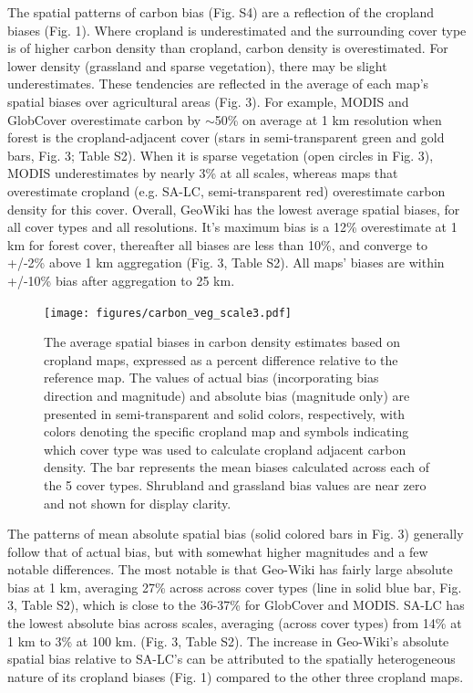 \documentclass{pnastwo}
\begin{document}
\begin{article}
The spatial patterns of carbon bias (Fig. S4) are a reflection of the cropland biases (Fig. 1). Where cropland is underestimated and the surrounding cover type is of higher carbon density than cropland, carbon density is overestimated. For lower density (grassland and sparse vegetation), there may be slight underestimates.  These tendencies are reflected in the average of each map's spatial biases over agricultural areas (Fig. 3).  For example, MODIS and GlobCover overestimate carbon by $\sim$50\% on average at 1 km resolution when forest is the cropland-adjacent cover (stars in semi-transparent green and gold bars, Fig. 3; Table S2). When it is sparse vegetation (open circles in Fig. 3), MODIS underestimates by nearly 3\% at all scales, whereas maps that overestimate cropland (e.g. SA-LC, semi-transparent red) overestimate carbon density for this cover.  Overall, GeoWiki has the lowest average spatial biases, for all cover types and all resolutions. It's maximum bias is a 12\% overestimate at 1 km for forest cover, thereafter all biases are less than 10\%, and converge to +/-2\% above 1 km aggregation (Fig. 3, Table S2). All maps' biases are within +/-10\% bias after aggregation to 25 km.

\vspace{-0.9 cm}
\begin{figure}[ht]
\centerline{\texttt{[image: figures/carbon\_veg\_scale3.pdf]}}
\caption{The average spatial biases in carbon density estimates based on cropland maps, expressed as a percent difference relative to the reference map. The values of actual bias (incorporating bias direction and magnitude) and absolute bias (magnitude only) are presented in semi-transparent and solid colors, respectively, with colors denoting the specific cropland map and symbols indicating which cover type was used to calculate cropland adjacent carbon density. The bar represents the mean biases calculated across each of the 5 cover types. Shrubland and grassland bias values are near zero and not shown for display clarity.}
\label{afoto}
\end{figure}

The patterns of mean absolute spatial bias (solid colored bars in Fig. 3) generally follow that of actual bias, but with somewhat higher magnitudes and a few notable differences. The most notable is that Geo-Wiki has fairly large absolute bias at 1 km, averaging 27\% across across cover types (line in solid blue bar, Fig. 3, Table S2), which is close to the 36-37\% for GlobCover and MODIS. SA-LC has the lowest absolute bias across scales, averaging (across cover types) from 14\% at 1 km to 3\% at 100 km. (Fig. 3, Table S2). The increase in Geo-Wiki's absolute spatial bias relative to SA-LC's can be attributed to the spatially heterogeneous nature of its cropland biases (Fig. 1) compared to the other three cropland maps.


\end{article}
\end{document}
